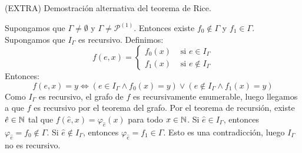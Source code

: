 \documentclass[twoside]{article}
\begin{document}
\newpage
\begin{ejercicio}{(EXTRA)}
Demostración alternativa del teorema de Rice.
\end{ejercicio}
\begin{solucion}
\end{solucion}
Supongamos que $Γ \neq \emptyset$ y $Γ \neq \mathcal{P}^{(1)}$. Entonces existe $f_0 \notin Γ$ y $f_1 \in Γ$. Supongamos que $I_Γ$ es recursivo. Definimos:
\[ f(e,x) = \begin{cases}
	f_0(x) &\text{ si }e \in I_Γ\\
	f_1(x) &\text{ si }e \notin I_Γ
\end{cases}\]
Entonces:
\[ f(e,x) = y \Leftrightarrow (e \in I_Γ \land f_0(x) = y) \lor (e \notin I_Γ \land f_1(x) = y) \]
Como $I_Γ$ es recursivo, el grafo de $f$ es recursivamente enumerable, luego llegamos a que $f$ es recursivo por el teorema del grafo. Por el teorema de recursión, existe $\hat{e} \in \mathbb{N}$ tal que $f(\hat{e},x) = φ_{\hat{e}}(x)$ para todo $x \in \mathbb{N}$. Si $\hat{e} \in I_Γ$, entonces $φ_{\hat{e}} = f_0 \notin Γ$. Si $\hat{e} \notin I_Γ$, entonces $φ_{\hat{e}} = f_1 \in Γ$. Esto es una contradicción, luego $I_Γ$ no es recursivo.
\end{document}
